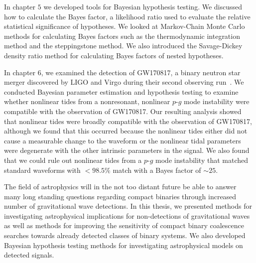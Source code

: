In chapter $5$ we developed tools for Bayesian hypothesis testing. We discussed how to calculate the Bayes factor, a likelihood ratio used to evaluate the relative statistical significance of hypotheses. We looked at Markov-Chain Monte Carlo methods for calculating Bayes factors such as the thermodynamic integration method and the steppingstone method. We also introduced the Savage-Dickey density ratio method for calculating Bayes factors of nested hypotheses.

In chapter $6$, we examined the detection of GW170817, a binary neutron star merger discovered by LIGO and Virgo during their second observing run~\cite{TheLIGOScientific:2017qsa}. We conducted Bayesian parameter estimation and hypothesis testing to examine whether nonlinear tides from a nonresonant, nonlinear $p$-$g$ mode instability were compatible with the observation of GW170817. Our resulting analysis showed that nonlinear tides were broadly compatible with the observation of GW170817, although we found that this occurred because the nonlinear tides either did not cause a measurable change to the waveform or the nonlinear tidal parameters were degenerate with the other intrinsic parameters in the signal. We also found that we could rule out nonlinear tides from a $p$-$g$ mode instability that matched standard waveforms with $< 98.5 \%$ match with a Bayes factor of $\sim 25$.

The field of astrophysics will in the not too distant future be able to answer many long standing questions regarding compact binaries through increased number of gravitational wave detections. In this thesis, we presented methods for investigating astrophysical implications for non-detections of gravitational waves as well as methods for improving the sensitivity of compact binary coalescence searches towards already detected classes of binary systems. We also developed Bayesian hypothesis testing methods for investigating astrophysical models on detected signals.
